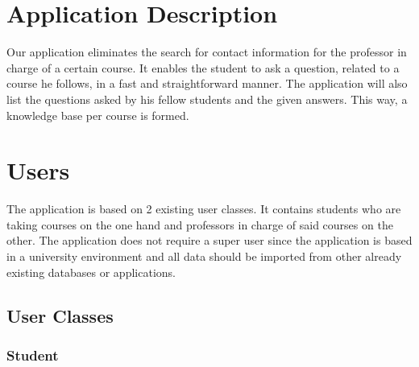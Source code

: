 \documentclass[10pt]{report}
\begin{document}
\section{Application Description}
Our application eliminates the search for contact information for the professor in charge of a certain course. It enables the student to ask a question, related to a course he follows, in a fast and straightforward manner. The application will also list the questions asked by his fellow students and the given answers. This way, a knowledge base
per course is formed.

\section{Users}
The application is based on 2 existing user classes. It contains students who are taking courses on the one hand and professors in charge of said courses on the other. The application does not require a super user since the application is based in a university environment and all data should be imported from other already existing databases or applications.

\subsection{User Classes}

\subsubsection{Student}
\end{document}
